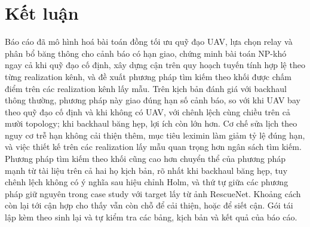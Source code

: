 \section{Kết luận}
\label{sec:conclusion}

Báo cáo đã mô hình hoá bài toán đồng tối ưu quỹ đạo UAV, lựa chọn relay và phân bổ băng thông cho cảnh báo có hạn giao, chứng minh bài toán NP-khó ngay cả khi quỹ đạo cố định, xây dựng cận trên quy hoạch tuyến tính hợp lệ theo từng realization kênh, và đề xuất phương pháp tìm kiếm theo khối được chấm điểm trên các realization kênh lấy mẫu. Trên \ResultTwoScenarioCount{} kịch bản đánh giá với backhaul thông thường, phương pháp này giao đúng hạn \ResultTwoTimelyVzeroBtwo{} số cảnh báo, so với \ResultTwoTimelyVzeroBone{} khi UAV bay theo quỹ đạo cố định và \ResultTwoTimelyVzeroBzero{} khi không có UAV, với chênh lệch cùng chiều trên cả mười topology; khi backhaul băng hẹp, lợi ích còn lớn hơn. Cơ chế sửa lịch theo nguy cơ trễ hạn không cải thiện thêm, mục tiêu leximin làm giảm tỷ lệ đúng hạn, và việc thiết kế trên các realization lấy mẫu quan trọng hơn ngân sách tìm kiếm. Phương pháp tìm kiếm theo khối cũng cao hơn chuyển thể của phương pháp mạnh từ tài liệu trên cả hai họ kịch bản, rõ nhất khi backhaul băng hẹp, tuy chênh lệch không có ý nghĩa sau hiệu chỉnh Holm, và thứ tự giữa các phương pháp giữ nguyên trong case study với target lấy từ ảnh RescueNet. Khoảng cách còn lại tới cận hợp cho thấy vẫn còn chỗ để cải thiện, hoặc để siết cận. Gói tái lập kèm theo sinh lại và tự kiểm tra các bảng, kịch bản và kết quả của báo cáo.
